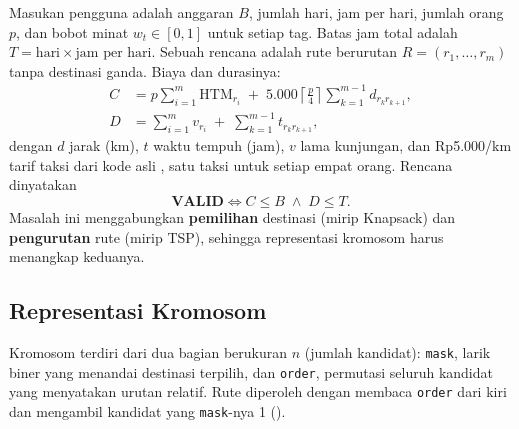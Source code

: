 Masukan pengguna adalah anggaran $B$, jumlah hari, jam per hari, jumlah orang $p$, dan bobot minat $w_t \in [0, 1]$ untuk setiap tag. Batas jam total adalah $T = \text{hari} \times \text{jam per hari}$. Sebuah rencana adalah rute berurutan $R = (r_1, \dots, r_m)$ tanpa destinasi ganda. Biaya dan durasinya:
\begin{align}
C &= p \sum_{i=1}^{m} \text{HTM}_{r_i} \;+\; 5.000 \left\lceil \tfrac{p}{4} \right\rceil \sum_{k=1}^{m-1} d_{r_k r_{k+1}}, \label{eq:biaya}\\
D &= \sum_{i=1}^{m} v_{r_i} \;+\; \sum_{k=1}^{m-1} t_{r_k r_{k+1}}, \label{eq:durasi}
\end{align}
dengan $d$ jarak (km), $t$ waktu tempuh (jam), $v$ lama kunjungan, dan Rp5.000/km tarif taksi dari kode asli \cite{repo}, satu taksi untuk setiap empat orang. Rencana dinyatakan
\begin{equation}
\textbf{VALID} \iff C \le B \;\wedge\; D \le T.
\end{equation}
Masalah ini menggabungkan \textbf{pemilihan} destinasi (mirip Knapsack) dan \textbf{pengurutan} rute (mirip TSP), sehingga representasi kromosom harus menangkap keduanya.

\subsection{Representasi Kromosom}
\label{sec:kromosom}

Kromosom terdiri dari dua bagian berukuran $n$ (jumlah kandidat): \texttt{mask}, larik biner yang menandai destinasi terpilih, dan \texttt{order}, permutasi seluruh kandidat yang menyatakan urutan relatif. Rute diperoleh dengan membaca \texttt{order} dari kiri dan mengambil kandidat yang \texttt{mask}-nya 1 ().

